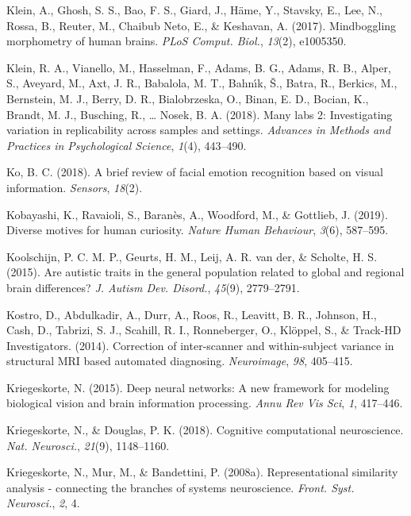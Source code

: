 \documentclass[11pt,american,a4paper,oneside,]{memoir} %
\begin{document}
\leavevmode\hypertarget{ref-Klein2017-su}{}%
Klein, A., Ghosh, S. S., Bao, F. S., Giard, J., Häme, Y., Stavsky, E., Lee, N., Rossa, B., Reuter, M., Chaibub Neto, E., \& Keshavan, A. (2017). Mindboggling morphometry of human brains. \emph{PLoS Comput. Biol.}, \emph{13}(2), e1005350.

\leavevmode\hypertarget{ref-Klein2018-un}{}%
Klein, R. A., Vianello, M., Hasselman, F., Adams, B. G., Adams, R. B., Alper, S., Aveyard, M., Axt, J. R., Babalola, M. T., Bahnı́k, Š., Batra, R., Berkics, M., Bernstein, M. J., Berry, D. R., Bialobrzeska, O., Binan, E. D., Bocian, K., Brandt, M. J., Busching, R., \ldots{} Nosek, B. A. (2018). Many labs 2: Investigating variation in replicability across samples and settings. \emph{Advances in Methods and Practices in Psychological Science}, \emph{1}(4), 443--490.

\leavevmode\hypertarget{ref-Ko2018-rv}{}%
Ko, B. C. (2018). A brief review of facial emotion recognition based on visual information. \emph{Sensors}, \emph{18}(2).

\leavevmode\hypertarget{ref-kobayashi2019diverse}{}%
Kobayashi, K., Ravaioli, S., Baranès, A., Woodford, M., \& Gottlieb, J. (2019). Diverse motives for human curiosity. \emph{Nature Human Behaviour}, \emph{3}(6), 587--595.

\leavevmode\hypertarget{ref-Koolschijn2015-hd}{}%
Koolschijn, P. C. M. P., Geurts, H. M., Leij, A. R. van der, \& Scholte, H. S. (2015). Are autistic traits in the general population related to global and regional brain differences? \emph{J. Autism Dev. Disord.}, \emph{45}(9), 2779--2791.

\leavevmode\hypertarget{ref-Kostro2014-cm}{}%
Kostro, D., Abdulkadir, A., Durr, A., Roos, R., Leavitt, B. R., Johnson, H., Cash, D., Tabrizi, S. J., Scahill, R. I., Ronneberger, O., Klöppel, S., \& Track-HD Investigators. (2014). Correction of inter-scanner and within-subject variance in structural MRI based automated diagnosing. \emph{Neuroimage}, \emph{98}, 405--415.

\leavevmode\hypertarget{ref-Kriegeskorte2015-qi}{}%
Kriegeskorte, N. (2015). Deep neural networks: A new framework for modeling biological vision and brain information processing. \emph{Annu Rev Vis Sci}, \emph{1}, 417--446.

\leavevmode\hypertarget{ref-Kriegeskorte2018-om}{}%
Kriegeskorte, N., \& Douglas, P. K. (2018). Cognitive computational neuroscience. \emph{Nat. Neurosci.}, \emph{21}(9), 1148--1160.

\leavevmode\hypertarget{ref-Kriegeskorte2008-kv}{}%
Kriegeskorte, N., Mur, M., \& Bandettini, P. (2008a). Representational similarity analysis - connecting the branches of systems neuroscience. \emph{Front. Syst. Neurosci.}, \emph{2}, 4.
\end{document}
